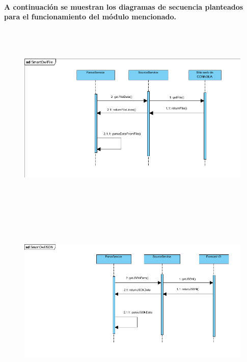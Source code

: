     \paragraph{A continuación se muestran los diagramas de secuencia planteados para el funcionamiento del módulo mencionado.}

    \begin{figure}[b!]
      \begin{center}
        \includegraphics[width=14cm,height=9cm]{./images/SmartOwlSequenceDiagram}
      \end{center}
    \end{figure}

    \begin{figure}[b!]
      \begin{center}
        \includegraphics[width=14cm,height=9cm]{./images/SmartOwlSequenceDiagram2}
      \end{center}
    \end{figure}

